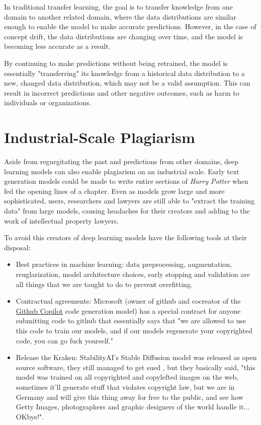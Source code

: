 In traditional transfer learning, the goal is to transfer knowledge from one domain to another related domain, where the data distributions are similar enough to enable the model to make accurate predictions. However, in the case of concept drift, the data distributions are changing over time, and the model is becoming less accurate as a result. 

By continuing to make predictions without being retrained, the model is essentially "transferring" its knowledge from a historical data distribution to a new, changed data distribution, which may not be a valid assumption. This can result in incorrect predictions and other negative outcomes, such as harm to individuals or organizations.

\section{Industrial-Scale Plagiarism}

Aside from regurgitating the past and predictions from other domains, deep learning models can also enable plagiarism on an industrial scale. Early text generation models could be made to write entire sections of \textit{Harry Potter} when fed the opening lines of a chapter. Even as models grow large and more sophisticated, users, researchers and lawyers are still able to "extract the training data"  from large models, causing headaches for their creators and adding to the work of intellectual property lawyers. 

To avoid this creators of deep learning models have the following tools at their disposal:


\begin{itemize}
\item Best practices in  machine learning: data preprocessing, augmentation, reuglarization, model architecture choices, early stopping and validation are all things that we are taught to do to prevent overfitting.
\item Contractual agreements: Microsoft (owner of github and cocreator of the \href{https://github.com/features/copilot}{Github Copilot} code generation model) has a special contract for anyone submitting code to github that essentially says that "we are allowed to use this code to train our models, and if our models regenerate your copyrighted code, you can go fuck yourself."
\item Release the Kraken: StabilityAI's Stable Diffusion model was released as open source software, they still managed to get sued \cite{getty}, but they basically said, "this model was trained on all copyrighted and copylefted images on the web, sometimes it'll generate stuff that violates copyright law, but we are in Germany and will give this thing away for free to the public, and see how Getty Images, photographers and graphic designers of the world handle it... OKbye!". 
\end{itemize}


